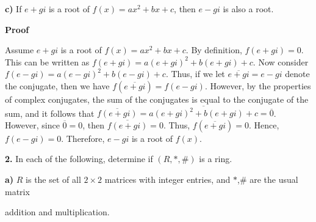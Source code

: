 \documentclass[12pt, a4paper]{article}
\begin{document}
\vspace{4mm}

\par\textbf{c)} If $e+gi$ is a root of $f(x)=ax^2+bx+c$, then $e-gi$ is also a root.

\vspace{4mm}

\begin{addmargin}[2.8em]{2.8em}

    \noindent\textbf{Proof}
    
    \vspace{2mm}
    
    \noindent Assume $e+gi$ is a root of $f(x)=ax^2+bx+c$. By definition, $f(e+gi)=0$. This can be written as $f(e+gi)=a(e+gi)^2+b(e+gi)+c$. Now consider $f(e-gi)=a(e-gi)^2+b(e-gi)+c$. Thus, if we let $\overline{e+gi}=e-gi$ denote the conjugate, then we have $f(\overline{e+gi})=f(e-gi)$. However, by the properties of complex conjugates, the sum of the conjugates is equal to the conjugate of the sum, and it follows that $\overline{f(e+gi)}=\overline{a(e+gi)^2+b(e+gi)+c}=\overline{0}$. However, since $\overline{0}=0$, then $\overline{f(e+gi)}=0$. Thus, $f(\overline{e+gi})=0$. Hence, $f(e-gi)=0$. Therefore, $e-gi$ is a root of $f(x)$.\hspace{45mm}\blacksquare

\end{addmargin}

\vspace{6mm}

\noindent\textbf{2.} In each of the following, determine if $(R,*,\#)$ is a ring.

\vspace{4mm}

\par\textbf{a)} $R$ is the set of all $2\times 2$ matrices with integer entries, and $*$,$\#$ are the usual matrix\par\hspace{4mm} addition and multiplication.

\vspace{4mm}
\end{document}
